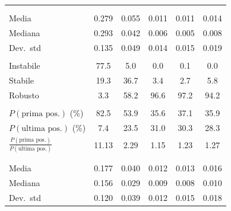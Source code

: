 \documentclass[../relazione.tex]{subfiles}
\begin{document}
\begin{xltabular}{\textwidth}{X *{5}{c}}
  \\
  \\
 \hspace{1em}Media & 0.279 & 0.055 & 0.011 & 0.011 & 0.014 \\
 \hspace{1em}Mediana & 0.293 & 0.042 & 0.006 & 0.005 & 0.008 \\
 \hspace{1em}Dev.\ std & 0.135 & 0.049 & 0.014 & 0.015 & 0.019 \\

  \\
 \hspace{1em}Instabile & 77.5 & 5.0 & 0.0 & 0.1 & 0.0 \\
 \hspace{1em}Stabile & 19.3 & 36.7 & 3.4 & 2.7 & 5.8 \\
 \hspace{1em}Robusto & 3.3 & 58.2 & 96.6 & 97.2 & 94.2 \\

  \\
 \hspace{1em}$P(\text{prima pos.})$ (\%) & 82.5 & 53.9 & 35.6 & 37.1 & 35.9 \\
 \hspace{1em}$P(\text{ultima pos.})$ (\%) & 7.4 & 23.5 & 31.0 & 30.3 & 28.3 \\
 \hspace{1em}$\frac{P(\text{prima pos.})}{P(\text{ultima pos.})}$ & 11.13 & 2.29 & 1.15 & 1.23 & 1.27 \\

  \\
  \\
 \hspace{1em}Media & 0.177 & 0.040 & 0.012 & 0.013 & 0.016 \\
 \hspace{1em}Mediana & 0.156 & 0.029 & 0.009 & 0.008 & 0.010 \\
 \hspace{1em}Dev.\ std & 0.120 & 0.039 & 0.012 & 0.015 & 0.018 \\


\end{xltabular}
\end{document}
